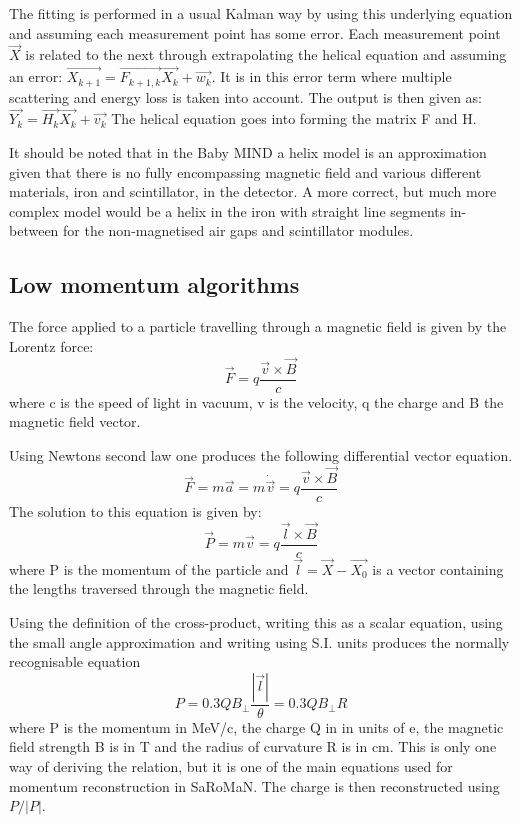 The fitting is performed in a usual Kalman way by using this underlying equation and assuming each measurement point has some error.
Each measurement point $\vec{X}$ is related to the next through extrapolating the helical equation and assuming an error: $\vec{X_{k+1}} = \vec{F_{k+1,k}}\vec{X_k} + \vec{w_k}$. 
It is in this error term where multiple scattering and energy loss is taken into account.
The output is then given as: $\vec{Y_{k}} = \vec{H_{k}}\vec{X_k} + \vec{v_k}$
The helical equation goes into forming the matrix F and H.

It should be noted that in the Baby MIND a helix model is an approximation given that there is no fully encompassing magnetic field and various different materials, iron and scintillator, in the detector. A more correct, but much more complex model would be a helix in the iron with straight line segments in-between for the non-magnetised air gaps and scintillator modules.

\subsection{Low momentum algorithms}
The force applied to a particle travelling through a magnetic field is given by the Lorentz force:
\begin{equation}
\vec{F}=q\frac{\vec{v}\times\vec{B}}{c}
\end{equation}
where c is the speed of light in vacuum, v is the velocity, q the charge and B the magnetic field vector.

Using Newtons second law one produces the following differential vector equation.
\begin{equation}
\vec{F}=m\vec{a}=m\dot{\vec{v}}=q\frac{\vec{v}\times\vec{B}}{c}
\end{equation}
The solution to this equation is given by:
\begin{equation}
\vec{P}=m\vec{v}=q\frac{\vec{l}\times\vec{B}}{c}
\end{equation} 
where P is the momentum of the particle and $\vec{l}=\vec{X}-\vec{X_0}$ is a vector containing the lengths traversed through the magnetic field.

Using the definition of the cross-product, writing this as a scalar equation, using the small angle approximation and writing using S.I. units produces the normally recognisable equation
\begin{equation}
P = 0.3 QB_\bot \frac{|\vec{l}|}{\theta}=0.3 QB_\bot R
\end{equation}
where P is the momentum in MeV/c, the charge Q in in units of e, the magnetic field strength B is in T and the radius of curvature R is in cm. This is only one way of deriving the relation, but it is one of the main equations used for momentum reconstruction in SaRoMaN. The charge is then reconstructed using $P/|P|$. 


